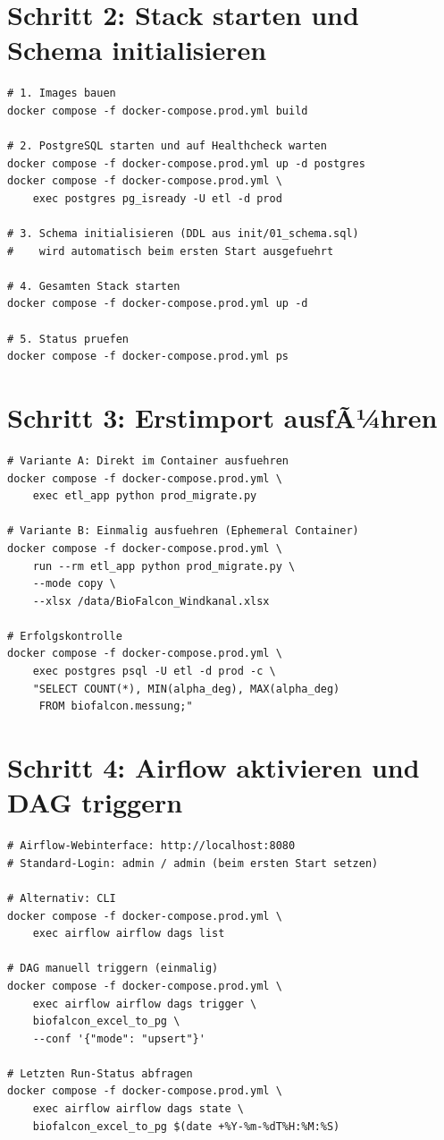 ﻿\documentclass[12pt,a4paper]{report}
\theoremstyle{definition}
\theoremstyle{remark}
\begin{document}
\section{Schritt 2: Stack starten und Schema initialisieren}

\begin{lstlisting}[style=bash, caption={Deployment: Stack starten}]
# 1. Images bauen
docker compose -f docker-compose.prod.yml build

# 2. PostgreSQL starten und auf Healthcheck warten
docker compose -f docker-compose.prod.yml up -d postgres
docker compose -f docker-compose.prod.yml \
    exec postgres pg_isready -U etl -d prod

# 3. Schema initialisieren (DDL aus init/01_schema.sql)
#    wird automatisch beim ersten Start ausgefuehrt

# 4. Gesamten Stack starten
docker compose -f docker-compose.prod.yml up -d

# 5. Status pruefen
docker compose -f docker-compose.prod.yml ps
\end{lstlisting}

\section{Schritt 3: Erstimport ausfÃ¼hren}

\begin{lstlisting}[style=bash, caption={Erstimport: Vollstaendige Migration der Excel-Quelldatei}]
# Variante A: Direkt im Container ausfuehren
docker compose -f docker-compose.prod.yml \
    exec etl_app python prod_migrate.py

# Variante B: Einmalig ausfuehren (Ephemeral Container)
docker compose -f docker-compose.prod.yml \
    run --rm etl_app python prod_migrate.py \
    --mode copy \
    --xlsx /data/BioFalcon_Windkanal.xlsx

# Erfolgskontrolle
docker compose -f docker-compose.prod.yml \
    exec postgres psql -U etl -d prod -c \
    "SELECT COUNT(*), MIN(alpha_deg), MAX(alpha_deg)
     FROM biofalcon.messung;"
\end{lstlisting}

\section{Schritt 4: Airflow aktivieren und DAG triggern}

\begin{lstlisting}[style=bash, caption={Airflow: DAG aktivieren und manuell triggern}]
# Airflow-Webinterface: http://localhost:8080
# Standard-Login: admin / admin (beim ersten Start setzen)

# Alternativ: CLI
docker compose -f docker-compose.prod.yml \
    exec airflow airflow dags list

# DAG manuell triggern (einmalig)
docker compose -f docker-compose.prod.yml \
    exec airflow airflow dags trigger \
    biofalcon_excel_to_pg \
    --conf '{"mode": "upsert"}'

# Letzten Run-Status abfragen
docker compose -f docker-compose.prod.yml \
    exec airflow airflow dags state \
    biofalcon_excel_to_pg $(date +%Y-%m-%dT%H:%M:%S)
\end{lstlisting}
\end{document}
